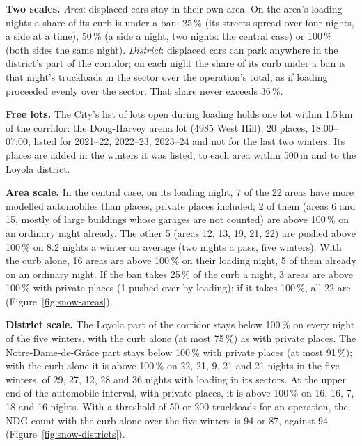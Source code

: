 \documentclass[11pt,a4paper]{article}
\begin{document}
\textbf{Two scales.} \emph{Area}: displaced cars stay in their own area. On the area\textquoteright{}s loading nights a share of its curb is under a ban: 25\,\% (its streets spread over four nights, a side at a time), 50\,\% (a side a night, two nights: the central case) or 100\,\% (both sides the same night). \emph{District}: displaced cars can park anywhere in the district\textquoteright{}s part of the corridor; on each night the share of its curb under a ban is that night\textquoteright{}s truckloads in the sector over the operation\textquoteright{}s total, as if loading proceeded evenly over the sector. That share never exceeds 36\,\%.

\textbf{Free lots.} The City\textquoteright{}s list of lots open during loading holds one lot within 1.5\,km of the corridor: the Doug-Harvey arena lot (4985 West Hill), 20 places, 18:00--07:00, listed for 2021--22, 2022--23, 2023--24 and not for the last two winters. Its places are added in the winters it was listed, to each area within 500\,m and to the Loyola district.

\textbf{Area scale.} In the central case, on its loading night, 7 of the 22 areas have more modelled automobiles than places, private places included; 2 of them (areas 6 and 15, mostly of large buildings whose garages are not counted) are above 100\,\% on an ordinary night already. The other 5 (areas 12, 13, 19, 21, 22) are pushed above 100\,\% on 8.2 nights a winter on average (two nights a pass, five winters). With the curb alone, 16 areas are above 100\,\% on their loading night, 5 of them already on an ordinary night. If the ban takes 25\,\% of the curb a night, 3 areas are above 100\,\% with private places (1 pushed over by loading); if it takes 100\,\%, all 22 are (Figure~\ref{fig:snow-areas}).

\textbf{District scale.} The Loyola part of the corridor stays below 100\,\% on every night of the five winters, with the curb alone (at most 75\,\%) as with private places. The Notre-Dame-de-Grâce part stays below 100\,\% with private places (at most 91\,\%); with the curb alone it is above 100\,\% on 22, 21, 9, 21 and 21 nights in the five winters, of 29, 27, 12, 28 and 36 nights with loading in its sectors. At the upper end of the automobile interval, with private places, it is above 100\,\% on 16, 16, 7, 18 and 16 nights. With a threshold of 50 or 200 truckloads for an operation, the NDG count with the curb alone over the five winters is 94 or 87, against 94 (Figure~\ref{fig:snow-districts}).
\end{document}
